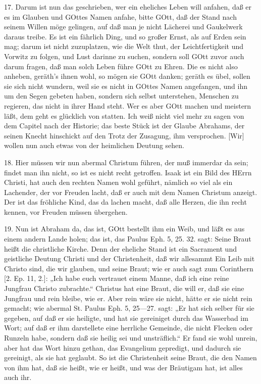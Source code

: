 17. Darum ist nun das geschrieben, wer ein eheliches Leben will anfahen, daß er es im Glauben und GOttes Namen anfahe, bitte GOtt, daß der Stand nach seinem Willen möge gelingen, auf daß man je nicht Lächerei und Gaukelwerk daraus treibe. Es ist ein fährlich Ding, und so großer Ernst, als auf Erden sein mag; darum ist nicht zuzuplatzen, wie die Welt thut, der Leichtfertigkeit und Vorwitz zu folgen, und Lust darinne zu suchen, sondern soll GOtt zuvor auch darum fragen, daß man solch Leben führe GOtt zu Ehren. Die es nicht also anheben, geräth’s ihnen wohl, so mögen sie GOtt danken; geräth es übel, sollen sie sich nicht wundern, weil sie es nicht in GOttes Namen angefangen, und ihn um den Segen gebeten haben, sondern sich selbst unterstehen, Menschen zu regieren, das nicht in ihrer Hand steht. Wer es aber GOtt machen und meistern läßt, dem geht es glücklich von statten. Ich weiß nicht viel mehr zu sagen von dem Capitel nach der Historie; das beste Stück ist der Glaube Abrahams, der seinen Knecht hinschickt auf den Trotz der Zusagung, ihm versprochen. [Wir] wollen nun auch etwas von der heimlichen Deutung sehen.

18. Hier müssen wir nun abermal Christum führen, der muß immerdar da sein; findet man ihn nicht, so ist es nicht recht getroffen. Isaak ist ein Bild des HErrn Christi, hat auch den rechten Namen wohl geführt, nämlich so viel als ein Lachender, der vor Freuden lacht, daß er auch mit dem Namen Christum anzeigt. Der ist das fröhliche Kind, das da lachen macht, daß alle Herzen, die ihn recht kennen, vor Freuden müssen übergehen.

19. Nun ist Abraham da, das ist, GOtt bestellt ihm ein Weib, und läßt es aus einem andern Lande holen; das ist, das Paulus Eph. 5, 25. 32. sagt: Seine Braut heißt die christliche Kirche. Denn der eheliche Stand ist ein Sacrament und geistliche Deutung Christi und der Christenheit, daß wir allesammt Ein Leib mit Christo sind, die wir glauben, und seine Braut; wie er auch sagt zum Corinthern [2. Ep. 11, 2.]: „Ich habe euch vertrauet einem Manne, daß ich
eine reine Jungfrau Christo zubrachte.“ Christus hat eine Braut, die will er, daß sie eine Jungfrau und rein bleibe, wie er. Aber rein wäre sie nicht, hätte er sie nicht rein gemacht; wie abermal St. Paulus Eph. 5, 25—27. sagt: „Er hat sich selber für sie gegeben, auf daß er sie heiligte, und hat sie gereiniget durch das Wasserbad im Wort; auf daß er ihm darstellete eine herrliche Gemeinde, die nicht Flecken oder Runzeln habe, sondern daß sie heilig sei und unsträflich.“ Er fand sie wohl unrein, aber hat das Wort hinzu gethan, das Evangelium gepredigt, und dadurch sie gereinigt, als sie hat geglaubt. So ist die Christenheit seine Braut, die den Namen von ihm hat, daß sie heißt, wie er heißt, und was der Bräutigam hat, ist alles auch ihr.

